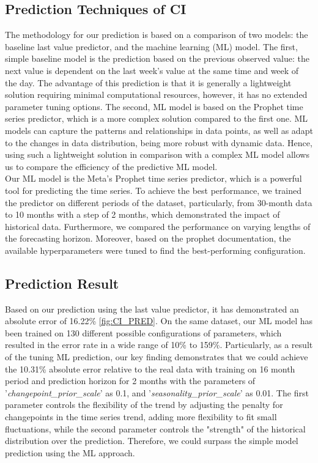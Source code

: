 \subsection{Prediction Techniques of CI}
The methodology for our prediction is based on a comparison of two models: the baseline last value predictor, and the machine learning (ML) model. 
The first, simple baseline model is the prediction based on the previous observed value: the next value is dependent on the last week’s value at the same time and week of the day. 
The advantage of this prediction is that it is generally a lightweight solution requiring minimal computational resources, however, it has no extended parameter tuning options. 
The second, ML model is based on the Prophet time series predictor, which is a more complex solution compared to the first one. 
ML models can capture the patterns and relationships in data points, as well as adapt to the changes in data distribution, being more robust with dynamic data. 
Hence, using such a lightweight solution in comparison with a complex ML model allows us to compare the efficiency of the predictive ML model. 
\\
Our ML model is the Meta’s Prophet time series predictor, which is a powerful tool for predicting the time series. 
To achieve the best performance, we trained the predictor on different periods of the dataset, particularly, from 30-month data to 10 months with a step of 2 months, which demonstrated the impact of historical data. 
Furthermore, we compared the performance on varying lengths of the forecasting horizon. 
Moreover, based on the prophet documentation, the available hyperparameters were tuned to find the best-performing configuration. 

\subsection{Prediction Result}
Based on our prediction using the last value predictor, it has demonstrated an absolute error of 16.22\% \ref{fig:CI_PRED}. 
On the same dataset, our ML model has been trained on 130 different possible configurations of parameters, which resulted in the error rate in a wide range of 10\% to 159\%. 
Particularly, as a result of the tuning ML prediction, our key finding demonstrates that we could achieve the 10.31\% absolute error relative to the real data with training on 16 month period and prediction horizon for 2 months with the parameters of '\textit{changepoint_prior_scale}' as 0.1, and '\textit{seasonality_prior_scale}' as 0.01. 
The first parameter controls the flexibility of the trend by adjusting the penalty for changepoints in the time series trend, adding more flexibility to fit small fluctuations, while the second parameter controls the "strength" of the historical distribution over the prediction. 
Therefore, we could surpass the simple model prediction using the ML approach. 

